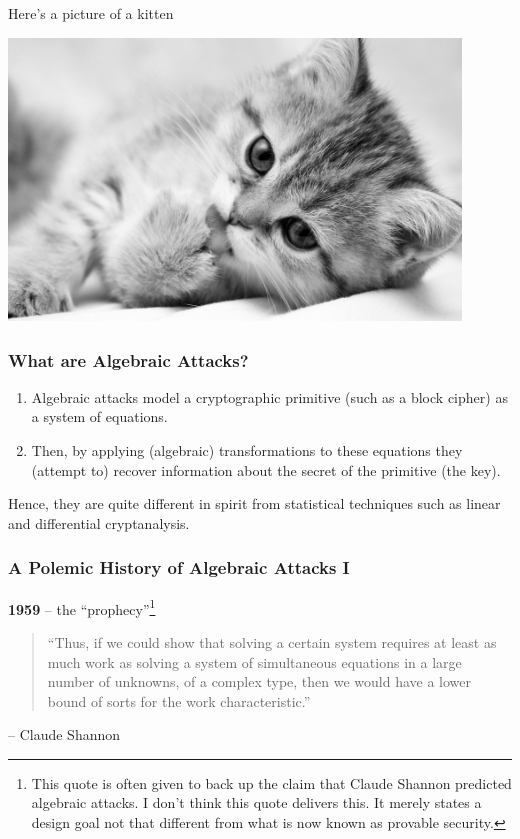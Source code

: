 \documentclass[9pt]{beamer}
\begin{document}
\begin{frame}{Here's a picture of a kitten}
\begin{center}
 \includegraphics[width=0.9\textwidth]{./kitten-01.jpg}
\end{center}
 
\end{frame}

\begin{frame}
\frametitle{What are Algebraic Attacks?} 

\begin{enumerate}
 \item Algebraic attacks model a cryptographic primitive (such as a block cipher) as a system of equations.
 \item Then, by applying (algebraic) transformations to these equations they (attempt to) recover information about the secret of the primitive (the key).
\end{enumerate}

\begin{block}{}
Hence, they are quite different in spirit from statistical techniques such as linear and differential cryptanalysis.
\end{block}

\end{frame}


\begin{frame}
\frametitle{A Polemic History of Algebraic Attacks I}
\textbf{1959} -- the ``prophecy''\footnote{This quote is often given to back up the claim that Claude Shannon predicted algebraic attacks. I don't think this quote delivers this. It merely states a design goal not that different from what is now known as provable security.}
\begin{quote}
``Thus, if we could show that solving a certain system requires at least as much work as solving a system of
simultaneous equations in a large number of unknowns, of a complex type, then we would have a lower bound of sorts for
the work characteristic.'' 
\end{quote}
\begin{flushright}
\vspace{-2em}
-- Claude Shannon
\end{flushright}
\end{frame}
\end{document}
